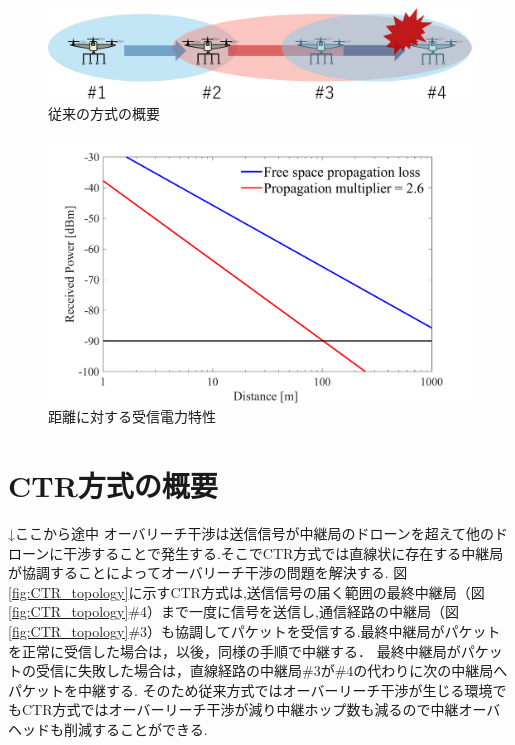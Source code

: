 \documentclass[a4paper,10.5pt]{ltjsarticle}
\begin{document}
\begin{figure}[H]
  \centering
  \includegraphics[width=\linewidth]{cenventional_topology.pdf} %
  \caption{従来の方式の概要}
  \label{fig:conventional_topology} %
\end{figure}

\begin{figure}[H]
  \centering
  \includegraphics[width=\linewidth]{lfsp_vs_distance_3.pdf} %
  \caption{距離に対する受信電力特性}
  \label{fig:lfsp_vs_distance_3} %
\end{figure}

\clearpage
\section{CTR方式の概要}
↓ここから途中
オーバリーチ干渉は送信信号が中継局のドローンを超えて他のドローンに干渉することで発生する.そこでCTR方式では直線状に存在する中継局が協調することによってオーバリーチ干渉の問題を解決する.
図\ref{fig:CTR_topology}に示すCTR方式は,送信信号の届く範囲の最終中継局（図\ref{fig:CTR_topology}\#4）まで一度に信号を送信し,通信経路の中継局（図\ref{fig:CTR_topology}\#3）も協調してパケットを受信する.最終中継局がパケットを正常に受信した場合は，以後，同様の手順で中継する．
最終中継局がパケットの受信に失敗した場合は，直線経路の中継局\#3が\#4の代わりに次の中継局へパケットを中継する.
そのため従来方式ではオーバーリーチ干渉が生じる環境でもCTR方式ではオーバーリーチ干渉が減り中継ホップ数も減るので中継オーバヘッドも削減することができる.
\end{document}
